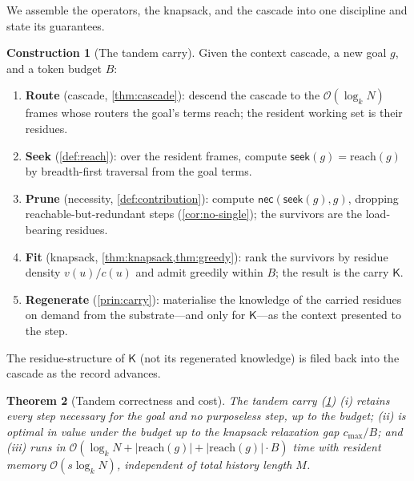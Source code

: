\documentclass[11pt,a4paper]{article}
\theoremstyle{thmstyle}
\newtheorem{theorem}{Theorem}[section]
\theoremstyle{definition}
\newtheorem{construction}[theorem]{Construction}
\theoremstyle{remark}
\newcommand{\goal}{g}                   %
\newcommand{\reach}{\mathrm{reach}}
\newcommand{\keep}{\mathsf{K}}
\newcommand{\budget}{B}
\newcommand{\seek}{\textsf{seek}}
\newcommand{\nec}{\textsf{nec}}
\newcommand{\val}{v}                    %
\newcommand{\cost}{c}                   %
\newcommand{\abs}[1]{\lvert#1\rvert}
\begin{document}
We assemble the operators, the knapsack, and the cascade into one discipline and
state its guarantees.

\begin{construction}[The tandem carry]
\label{con:tandem}
Given the context cascade, a new goal $\goal$, and a token budget $\budget$:
\begin{enumerate}[leftmargin=1.8em,itemsep=1pt]
\item \textbf{Route} (cascade, \cref{thm:cascade}): descend the cascade to the
$\mathcal{O}(\log_k N)$ frames whose routers the goal's terms reach; the resident
working set is their residues.
\item \textbf{Seek} (\cref{def:reach}): over the resident frames, compute
$\seek(\goal)=\reach(\goal)$ by breadth-first traversal from the goal terms.
\item \textbf{Prune} (necessity, \cref{def:contribution}): compute
$\nec(\seek(\goal),\goal)$, dropping reachable-but-redundant steps
(\cref{cor:no-single}); the survivors are the load-bearing residues.
\item \textbf{Fit} (knapsack, \cref{thm:knapsack,thm:greedy}): rank the survivors
by residue density $\val(u)/\cost(u)$ and admit greedily within $\budget$; the
result is the carry $\keep$.
\item \textbf{Regenerate} (\cref{prin:carry}): materialise the knowledge of the
carried residues on demand from the substrate---and only for $\keep$---as the
context presented to the step.
\end{enumerate}
The residue-structure of $\keep$ (not its regenerated knowledge) is filed back
into the cascade as the record advances.
\end{construction}

\begin{theorem}[Tandem correctness and cost]
\label{thm:tandem}
The tandem carry (\cref{con:tandem}) (i) retains every step necessary for the
goal and no purposeless step, up to the budget; (ii) is optimal in value under
the budget up to the knapsack relaxation gap $\cost_{\max}/\budget$; and (iii)
runs in $\mathcal{O}(\log_k N + \abs{\reach(\goal)} + \abs{\reach(\goal)}\cdot\budget)$
time with resident memory $\mathcal{O}(s\log_k N)$, independent of total history
length $M$.
\end{theorem}
\end{document}
